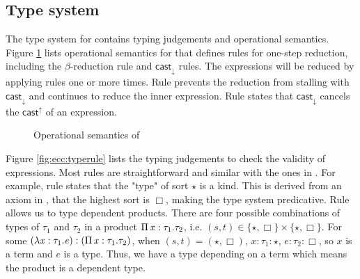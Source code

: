 \subsection{Type system}\label{sec:ecc:type}
The type system for \expcc contains typing judgements and operational semantics. Figure \ref{fig:ecc:dynsem} lists operational semantics for \expcc that defines rules for one-step reduction, including the $\beta$-reduction rule and $ \mathsf{cast}_{\downarrow} $ rules. The expressions will be reduced by applying rules one or more times. Rule  prevents the reduction from stalling with $ \mathsf{cast}_{\downarrow} $ and continues to reduce the inner expression. Rule  states that $ \mathsf{cast}_{\downarrow} $ cancels the $ \mathsf{cast}^{\uparrow} $ of an expression.

\begin{figure}[ht]
	\ottdefnstep{}
	\caption{Operational semantics of \expcc}
	\label{fig:ecc:dynsem}
\end{figure}

Figure \ref{fig:ecc:typerule} lists the typing judgements to check the validity of expressions. Most rules are straightforward and similar with the ones in \cc. For example, rule  states that the "type" of sort $ \star $ is a kind. This is derived from an axiom in \cc, that the highest sort is $ \Box $, making the type system predicative. Rule  allows us to type dependent products. There are four possible combinations of types of $\tau_{{\mathrm{1}}}$ and $\tau_{{\mathrm{2}}}$ in a product $\Pi \, \mathit{x}  :  \tau_{{\mathrm{1}}}  .  \tau_{{\mathrm{2}}}$, i.e. $(s,t) \in \{ \star ,  \Box \} \times \{ \star ,  \Box \}$. For some $(\lambda  \mathit{x}  :  \tau_{{\mathrm{1}}}  .  \mathit{e}):(\Pi \, \mathit{x}  :  \tau_{{\mathrm{1}}}  .  \tau_{{\mathrm{2}}})$, when $(s,t)=( \star , \Box )$, $x:\tau_{{\mathrm{1}}}: \star $, $e:\tau_{{\mathrm{2}}}: \Box $, so $x$ is a term and $e$ is a type. Thus, we have a type depending on a term which means the product is a dependent type.

